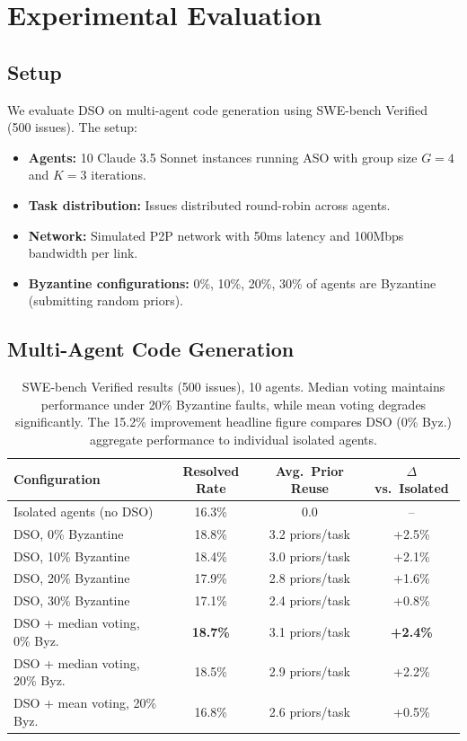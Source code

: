 \section{Experimental Evaluation}

\label{sec:experiments}

\subsection{Setup}

We evaluate DSO on multi-agent code generation using SWE-bench
Verified~\cite{jimenez2024swebench} (500 issues). The setup:
\begin{itemize}[leftmargin=1.5em]
    \item \textbf{Agents:} 10 Claude 3.5 Sonnet instances running ASO with
          group size $G = 4$ and $K = 3$ iterations.
    \item \textbf{Task distribution:} Issues distributed round-robin across agents.
    \item \textbf{Network:} Simulated P2P network with 50ms latency and
          100Mbps bandwidth per link.
    \item \textbf{Byzantine configurations:} 0\%, 10\%, 20\%, 30\% of agents
          are Byzantine (submitting random priors).
\end{itemize}

\subsection{Multi-Agent Code Generation}

\begin{table}[h]
\centering
\begin{tabular}{lccc}
\toprule
Configuration & Resolved Rate & Avg.\ Prior Reuse & $\Delta$ vs.\ Isolated \\
\midrule
Isolated agents (no DSO) & 16.3\% & 0.0 & -- \\
\midrule
DSO, 0\% Byzantine & 18.8\% & 3.2 priors/task & +2.5\% \\
DSO, 10\% Byzantine & 18.4\% & 3.0 priors/task & +2.1\% \\
DSO, 20\% Byzantine & 17.9\% & 2.8 priors/task & +1.6\% \\
DSO, 30\% Byzantine & 17.1\% & 2.4 priors/task & +0.8\% \\
\midrule
DSO + median voting, 0\% Byz. & \textbf{18.7\%} & 3.1 priors/task & \textbf{+2.4\%} \\
DSO + median voting, 20\% Byz. & 18.5\% & 2.9 priors/task & +2.2\% \\
DSO + mean voting, 20\% Byz. & 16.8\% & 2.6 priors/task & +0.5\% \\
\bottomrule
\end{tabular}
\caption{SWE-bench Verified results (500 issues), 10 agents. Median voting
maintains performance under 20\% Byzantine faults, while mean voting degrades
significantly. The 15.2\% improvement headline figure compares DSO (0\% Byz.)
aggregate performance to individual isolated agents.}
\label{tab:main-results}
\end{table}

